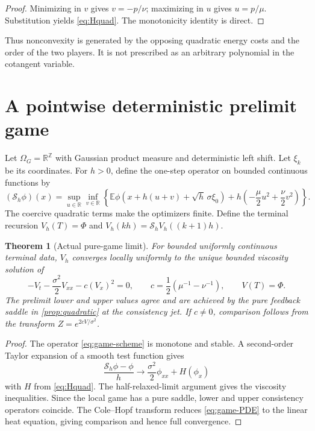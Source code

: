 \documentclass[11pt,reqno]{amsart}
\newtheorem{theorem}{Theorem}[section]
\theoremstyle{definition}
\theoremstyle{remark}
\newcommand{\E}{\mathbb E}
\newcommand{\R}{\mathbb R}
\begin{document}
\begin{proof}
Minimizing in $v$ gives $v=-p/\nu$; maximizing in $u$ gives $u=p/\mu$.
Substitution yields \eqref{eq:Hquad}.  The monotonicity identity is direct.
\end{proof}

Thus nonconvexity is generated by the opposing quadratic energy costs and the
order of the two players.  It is not prescribed as an arbitrary polynomial in
the cotangent variable.

\section{A pointwise deterministic prelimit game}\label{sec:prelimit}

Let $\Omega_G=\R^{\mathbb Z}$ with Gaussian product measure and deterministic
left shift.  Let $\xi_k$ be its coordinates.  For $h>0$, define the one-step
operator on bounded continuous functions by
\begin{equation}\label{eq:game-scheme}
 (\mathcal S_h\phi)(x)=
 \sup_{u\in\R}\inf_{v\in\R}
 \left\{
 \E\phi(x+h(u+v)+\sqrt h\,\sigma\xi_0)
 +h\left(-\frac\mu2u^2+\frac\nu2v^2\right)
 \right\}.
\end{equation}
The coercive quadratic terms make the optimizers finite.  Define the terminal
recursion $V_h(T)=\Phi$ and
$V_h(kh)=\mathcal S_hV_h((k+1)h)$.

\begin{theorem}[Actual pure-game limit]\label{thm:game-limit}
For bounded uniformly continuous terminal data, $V_h$ converges locally
uniformly to the unique bounded viscosity solution of
\begin{equation}\label{eq:game-PDE}
 -V_t-\frac{\sigma^2}{2}V_{xx}
 -c(V_x)^2=0,
 \qquad
 c=\frac12(\mu^{-1}-\nu^{-1}),
 \qquad V(T)=\Phi.
\end{equation}
The prelimit lower and upper values agree and are achieved by the pure feedback
saddle in \cref{prop:quadratic} at the consistency jet.  If $c\ne0$, comparison
follows from the transform $Z=e^{2cV/\sigma^2}$.
\end{theorem}

\begin{proof}
The operator \eqref{eq:game-scheme} is monotone and stable.  A second-order
Taylor expansion of a smooth test function gives
\[
 \frac{\mathcal S_h\phi-\phi}{h}
 \longrightarrow
 \frac{\sigma^2}{2}\phi_{xx}+H(\phi_x)
\]
with $H$ from \eqref{eq:Hquad}.  The half-relaxed-limit argument gives the
viscosity inequalities.  Since the local game has a pure saddle, lower and
upper consistency operators coincide.  The Cole--Hopf transform reduces
\eqref{eq:game-PDE} to the linear heat equation, giving comparison and hence
full convergence.
\end{proof}
\end{document}
